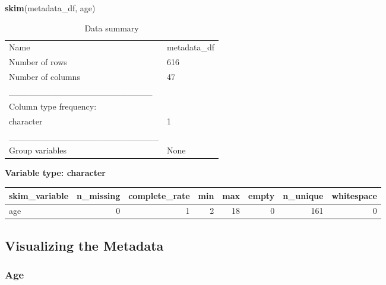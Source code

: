 \documentclass[]{article}
\newenvironment{Shaded}{\begin{snugshade}}{\end{snugshade}}
\newcommand{\DataTypeTok}[1]{\textcolor[rgb]{0.13,0.29,0.53}{#1}}
\newcommand{\KeywordTok}[1]{\textcolor[rgb]{0.13,0.29,0.53}{\textbf{#1}}}
\newcommand{\NormalTok}[1]{#1}
\newcommand{\OperatorTok}[1]{\textcolor[rgb]{0.81,0.36,0.00}{\textbf{#1}}}
\newcommand{\StringTok}[1]{\textcolor[rgb]{0.31,0.60,0.02}{#1}}
\begin{document}
\begin{Shaded}
\begin{Highlighting}[]
\KeywordTok{skim}\NormalTok{(metadata_df, age)}
\end{Highlighting}
\end{Shaded}

\begin{longtable}[]{@{}ll@{}}
\caption{Data summary}\tabularnewline
\toprule
\endhead
Name & metadata\_df\tabularnewline
Number of rows & 616\tabularnewline
Number of columns & 47\tabularnewline
\_\_\_\_\_\_\_\_\_\_\_\_\_\_\_\_\_\_\_\_\_\_\_ &\tabularnewline
Column type frequency: &\tabularnewline
character & 1\tabularnewline
\_\_\_\_\_\_\_\_\_\_\_\_\_\_\_\_\_\_\_\_\_\_\_\_ &\tabularnewline
Group variables & None\tabularnewline
\bottomrule
\end{longtable}

\textbf{Variable type: character}

\begin{longtable}[]{@{}lrrrrrrr@{}}
\toprule
skim\_variable & n\_missing & complete\_rate & min & max & empty &
n\_unique & whitespace\tabularnewline
\midrule
\endhead
age & 0 & 1 & 2 & 18 & 0 & 161 & 0\tabularnewline
\bottomrule
\end{longtable}

\hypertarget{visualizing-the-metadata}{%
\subsection{Visualizing the Metadata}\label{visualizing-the-metadata}}

\hypertarget{age}{%
\subsubsection{Age}\label{age}}

\begin{Shaded}
\end{Shaded}
\end{document}
